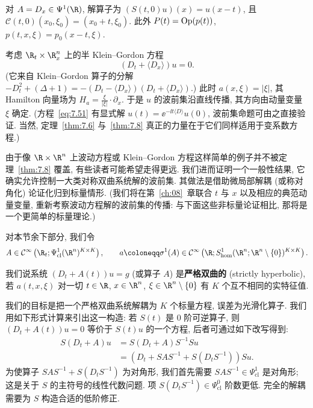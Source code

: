 \begin{example}[简单输运方程]\label{eg:7.11}
对 $A = D_x \in \Psi^1(\R)$, 解算子为 $(S(t, 0)u)(x) = u(x - t)$, 且 $\mathcal{C}(t, 0)(x_0, \xi_0) = (x_0 + t, \xi_0)$. 此外 $P(t) = \operatorname{Op}(p(t))$, $p(t, x, \xi) = p_0(x - t, \xi)$.
\end{example}

\begin{example}\label{eg:7.12}
考虑 $\R_t \times \R^n_x$ 上的半 Klein--Gordon 方程
\begin{equation}\label{eq:7.51}
    (D_t + \langle D_x \rangle) u = 0.
\end{equation}
(它来自 Klein--Gordon 算子的分解 $-D_t^2 + (\Delta + 1) = -(D_t - \langle D_x \rangle)(D_t + \langle D_x \rangle)$.) 此时 $a(x, \xi) = | \xi |$, 其 Hamilton 向量场为 $H_a = \frac{\xi}{|\xi|} \cdot \partial_x$. 于是 $u$ 的波前集沿直线传播, 其方向由动量变量 $\xi$ 确定. (方程~\eqref{eq:7.51} 有显式解 $u(t) = \ee^{-\ii t \langle D \rangle}u(0)$, 波前集命题可由之直接验证. 当然, 定理~\ref{thm:7.6} 与~\ref{thm:7.8} 真正的力量在于它们同样适用于变系数方程.)
\end{example}



由于像 $\R \times \R^n$ 上波动方程或 Klein--Gordon 方程这样简单的例子并不被定理~\ref{thm:7.8} 覆盖, 有些读者可能希望走得更远. 我们进而证明一个一般性结果, 它确实允许控制一大类对称双曲系统解的波前集. 其做法是借助微局部解耦 (或称对角化) 论证化归到标量情形. (我们将在第~\ref{ch:08}~章联合 $t$ 与 $x$ 以及相应的典范动量变量, 重新考察波动方程解的波前集的传播: 与下面这些非标量论证相比, 那将是一个更简单的标量理论.)

对本节余下部分, 我们令
\begin{equation}\label{eq:7.52}
    A \in \Smooth\left( \R_t; \Psi^1_{\mathrm{cl}}(\R^n)^{K \times K} \right), \qquad
    a \defeq \sigma^1(A) \in \Smooth\left( \R; S^1_{\mathrm{hom}}(\R^n; \R^n \setminus \{0\})^{K \times K} \right).
\end{equation}

\begin{definition}[严格双曲性]\label{def:7.13}
我们说系统 $(D_t + A(t))u = g$ (或算子 $A$) 是\textbf{严格双曲的} (strictly hyperbolic), 若 $a(t, x, \xi)$ 对一切 $t \in \R$, $x \in \R^n$, $\xi \in \R^n \setminus \{0\}$ 有 $K$ 个互不相同的实特征值.
\end{definition}

我们的目标是把一个严格双曲系统解耦为 $K$ 个标量方程, 误差为光滑化算子. 我们用如下形式计算来引出这一构造: 若 $S(t)$ 是 $0$ 阶可逆算子, 则 $(D_t + A(t))u = 0$ 等价于 $S(t)u$ 的一个方程, 后者可通过如下改写得到:
\begin{equation}\label{eq:7.53}
    \begin{aligned}
        S(D_t + A)u &= S(D_t + A)S^{-1}Su \\
        &= \left( D_t + SAS^{-1} + S(D_tS^{-1}) \right)Su.
    \end{aligned}
\end{equation}
为使算子 $SAS^{-1} + S(D_tS^{-1})$ 为对角形, 我们首先需要 $SAS^{-1} \in \Psi^1_{\mathrm{cl}}$ 是对角形; 这是关于 $S$ 的主符号的线性代数问题. 项 $S(D_tS^{-1}) \in \Psi^0_{\mathrm{cl}}$ 阶数更低. 完全的解耦需要为 $S$ 构造合适的低阶修正.


